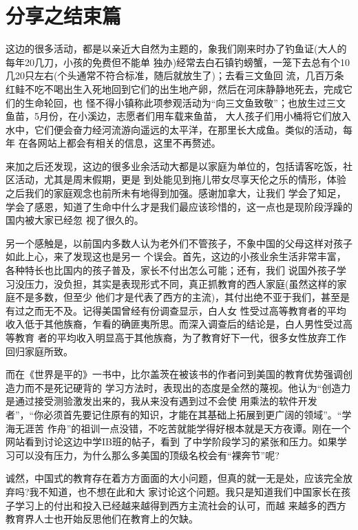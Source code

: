 \documentclass[11pt,a4paper,onecolumn]{article}
\begin{document}
\section{分享之结束篇}

这边的很多活动，都是以亲近大自然为主题的，象我们刚来时办了钓鱼证(大人的每年20几刀，小孩的免费但不能单
独办)经常去白石镇钓螃蟹，一笼下去总有个10几20只左右(个头通常不符合标准，随后就放生了)；去看三文鱼回
流，几百万条红鲑不吃不喝出生入死地回到它们的出生地产卵，然后在河床静静地死去，完成它们的生命轮回，也
怪不得小镇称此项参观活动为``向三文鱼致敬''；也放生过三文鱼苗，5月份，在小溪边，志愿者们用车载来鱼苗，
大人孩子们用小桶将它们放入水中，它们便会奋力经河流游向遥远的太平洋，在那里长大成鱼。类似的活动，每年
在各网站上都会有相关的信息，这里不再赘述。


来加之后还发现，这边的很多业余活动大都是以家庭为单位的，包括请客吃饭，社区活动，尤其是周末假期，更是
到处能见到拖儿带女尽享天伦之乐的情形，体验之后我们的家庭观念也前所未有地得到加强。感谢加拿大，让我们
学会了知足，学会了感恩，知道了生命中什么才是我们最应该珍惜的，这一点也是现阶段浮躁的国内被大家已经忽
视了很久的。


另一个感触是，以前国内多数人认为老外们不管孩子，不象中国的父母这样对孩子如此上心，来了发现这也是另一
个误会。首先，这边的小孩业余生活非常丰富，各种特长也比国内的孩子普及，家长不付出怎么可能；还有，我们
说国外孩子学习没压力，没负担，其实是表现形式不同，真正抓教育的西人家庭(虽然这样的家庭不是多数，但至少
他们才是代表了西方的主流)，其付出绝不亚于我们，甚至是有过之而无不及。记得美国曾经有份调查显示，白人女
性受过高等教育者的平均收入低于其他族裔，乍看的确匪夷所思。而深入调查后的结论是，白人男性受过高等教育
者的平均收入明显高于其他族裔，为了教育好下一代，很多女性放弃工作回归家庭所致。


而在《世界是平的》一书中，比尔盖茨在被该书的作者问到美国的教育优势\myrule 强调创造力而不是死记硬背的
学习方法时，表现出的态度是全然的蔑视。他认为``创造力是通过接受测验激发出来的，我从来没有遇到过不会使
用乘法的软件开发者''，``你必须首先要记住原有的知识，才能在其基础上拓展到更广阔的领域''。``学海无涯苦
作舟''的祖训一点没错，不吃苦就能学得好根本就是天方夜谭。刚在一个网站看到讨论这边中学IB班的帖子，看到
了中学阶段学习的紧张和压力。如果学习可以没有压力，为什么那么多美国的顶级名校会有``裸奔节''呢?


诚然，中国式的教育存在着方方面面的大小问题，但真的就一无是处，应该完全放弃吗?我不知道，也不想在此和大
家讨论这个问题。我只是知道我们中国家长在孩子学习上的付出和投入已经越来越得到西方主流社会的认可，而越
来越多的西方教育界人士也开始反思他们在教育上的欠缺。
\end{document}
